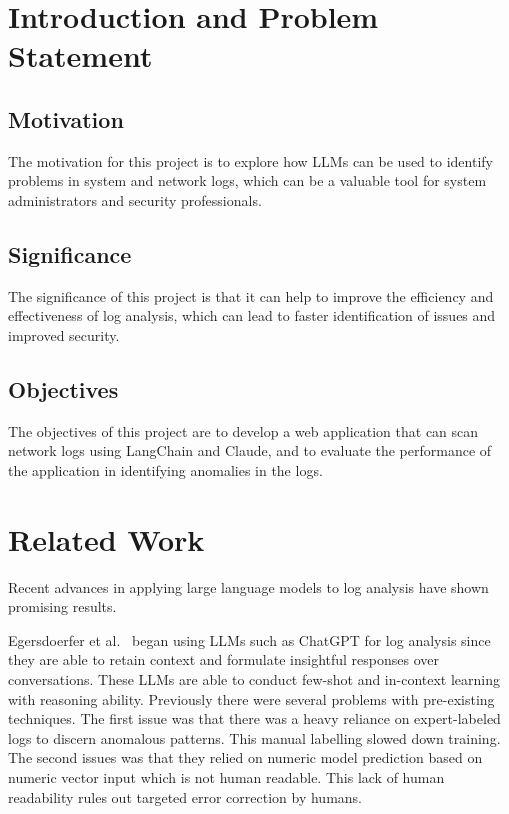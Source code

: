 \documentclass[sigconf]{acmart}
\begin{document}
\section{Introduction and Problem Statement}


\subsection{Motivation} 

The motivation for this project is to explore how LLMs can be used to identify problems in system and network logs, which can be a valuable tool for system administrators and security professionals. 

\subsection{Significance}

The significance of this project is that it can help to improve the efficiency and effectiveness of log analysis, which can lead to faster identification of issues and improved security. 

\subsection{Objectives}

The objectives of this project are to develop a web application that can scan network logs using LangChain and Claude, and to evaluate the performance of the application in identifying anomalies in the logs.


\section{Related Work}

Recent advances in applying large language models to log analysis have shown promising results. 

Egersdoerfer et al.~\cite{10.1145/3588195.3595943} began using LLMs such as ChatGPT for log analysis since they are able to retain context and formulate insightful responses over conversations. These LLMs are able to conduct few-shot and in-context learning with reasoning ability.
Previously there were several problems with pre-existing techniques. The first issue was that there was a heavy reliance on expert-labeled logs to discern anomalous patterns. This manual labelling slowed down training. The second issues was that they relied on numeric model prediction based on numeric vector input which is not human readable. This lack of human readability rules out targeted error correction by humans. 
\end{document}
